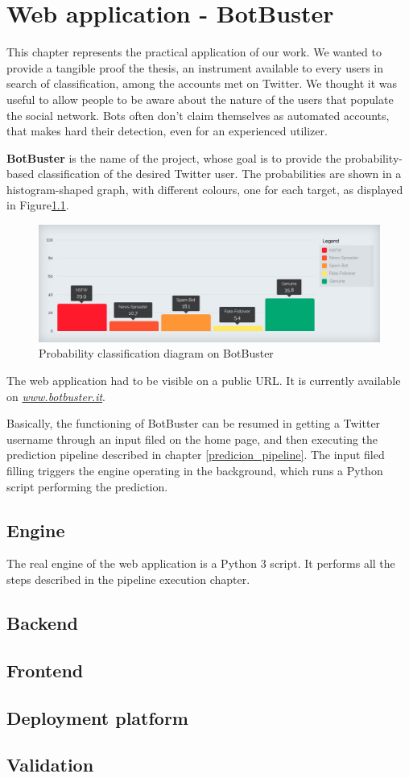 \chapter{Web application - BotBuster}
\label{capitolo6}
\thispagestyle{empty}
This chapter represents the practical application of our work. We wanted to provide a tangible proof the thesis, an instrument available to every users in search of classification, among the accounts met on Twitter.
We thought it was useful to allow people to be aware about the nature of the users that populate the social network.
Bots often don't claim themselves as automated accounts, that makes hard their detection, even for an experienced utilizer.


\textbf{BotBuster} is the name of the project, whose goal is to provide the probability-based classification of the desired Twitter user.
The probabilities are shown in a histogram-shaped graph, with different colours, one for each target, as displayed in Figure\ref{fig:histogram}.

\begin{figure}
	\begin{center}
		\includegraphics[width=\columnwidth]{chapter6/figure/histogram.jpg}\par 
	\end{center}
	\caption{Probability classification diagram on BotBuster}
	\label{fig:histogram}
\end{figure}

The web application had to be visible on a public URL. It is currently available on \href{http://www.botbuster.it}{\textit{www.botbuster.it}}.

Basically, the functioning of BotBuster can be resumed in getting a Twitter username through an input filed on the home page, and then executing the prediction pipeline described in chapter \ref{predicion_pipeline}.
The input filed filling triggers the engine operating in the background, which runs a Python script performing the prediction.


\section{Engine}
The real engine of the web application is a Python 3 script. It performs all the steps described in the pipeline execution chapter.
\section{Backend}
\section{Frontend}
\section{Deployment platform}
\section{Validation}
